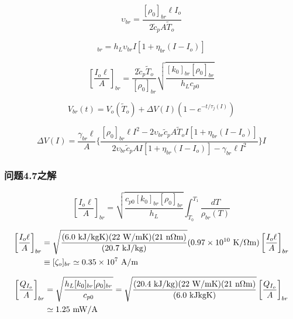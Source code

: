 \begin{equation}%
\upsilon_{br}=\frac{[\rho_0]_{br}\ell I_o}{2\tilde{c}_pA\tilde{T}_o}
\end{equation}

\begin{equation}%
[Q_I]_{br}=h_L\upsilon_{br}I[1+\eta_{br}(I-I_o)]
\end{equation}

\begin{equation}%
\left[\frac{I_o\ell}{A}\right]_{br}=\frac{2\tilde{c}_p\tilde{T}_o}{[\rho_0]_{br}}\sqrt{\frac{[k_0]_{br}[\rho_0]_{br}}{h_Lc_{p0}}}
\end{equation}

\begin{equation}%
V_{br}(t)=V_o(\tilde{T}_o)+\Delta V(I)(1-e^{-t/\tau_j(I)})
\end{equation}

\begin{equation}%
\Delta V(I)=\frac{\gamma_{br}\ell}{A}\{\frac{[\rho_0]_{br}\ell I^2-2\upsilon_{br}\tilde{c}_pA\tilde{T}_oI[1+\eta_{br}(I-I_o)]}{2\upsilon_{br}\tilde{c}_pAI[1+\eta_{br}(I-I_o)]-\gamma_{br}\ell I^2}\}I
\end{equation}

\subsubsection{问题4.7之解}

\begin{equation}
\left[\frac{I_o\ell}{A}\right]_{br}=\sqrt{\frac{c_{p0}[k_0]_{br}[\rho_0]_{br}}{h_L}}\int_{T_0}^{T_1}\frac{dT}{\rho_{br}(T)}
\end{equation}


\begin{align}%
\left[\frac{I_o\ell}{A}\right]_{br}&=\sqrt{\frac{(6.0\ \mathrm{kJ/kgK})(22\ \mathrm{W/mK})(21\ \mathrm{n\Omega m})}{(20.7\ \mathrm{kJ/kg})}}(0.97\times10^{10}\ \mathrm{K/\Omega m})
\left[\frac{I_o\ell}{A}\right]_{br}\\\notag
&\equiv[\zeta_o]_{br}\simeq 0.35\times 10^7\ \mathrm{A/m}
\end{align}

\begin{align}%
\left[\frac{Q_{I_o}}{A}\right]_{br}&=\sqrt{\frac{h_L[k_0]_{br}[\rho_0]_{br}}{c_{p0}}}=\sqrt{\frac{(20.4\ \mathrm{kJ/kg})(22\ \mathrm{W/mK})(21\ \mathrm{n\Omega m})}{(6.0\ \mathrm{kJkgK})}}
\left[\frac{Q_{I_o}}{A}\right]_{br}\\\notag
&\simeq 1.25\ \mathrm{mW/A}
\end{align}

